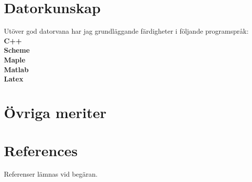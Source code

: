 \documentclass[11pt,a4paper,sans]{moderncv}        %
\begin{document}
\section{Datorkunskap}
Utöver god datorvana har jag grundläggande färdigheter i följande programspråk:\\
\textbf{C++}\\
\textbf{Scheme}\\
\textbf{Maple}\\
\textbf{Matlab}\\
\textbf{Latex}


\section{Övriga meriter}


\section{References}
Referenser lämnas vid begäran.
\end{document}
